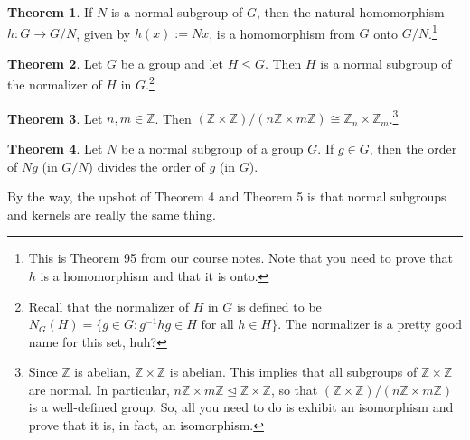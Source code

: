 \documentclass[11pt]{article}
\theoremstyle{definition}
\newtheorem{theorem}{Theorem}
\begin{document}
\begin{theorem}
If $N$ is a normal subgroup of $G$, then the natural homomorphism $h:G \to G/N$, given by $h(x) := Nx$, is a homomorphism from $G$ onto $G/N$.\footnote{This is Theorem 95 from our course notes. Note that you need to prove that $h$ is a homomorphism and that it is onto.}
\end{theorem}

\begin{theorem}
Let $G$ be a group and let $H\leq G$. Then $H$ is a normal subgroup of the normalizer of $H$ in $G$.\footnote{Recall that the normalizer of $H$ in $G$ is defined to be $N_G(H)=\{g\in G: g^{-1}hg\in H\text{ for all } h\in H\}$.  The normalizer is a pretty good name for this set, huh?}
\end{theorem}

\begin{theorem}
Let $n,m \in \mathbb{Z}$.  Then $(\mathbb{Z}\times \mathbb{Z})/(n\mathbb{Z}\times m\mathbb{Z})\cong \mathbb{Z}_n\times \mathbb{Z}_m$.\footnote{Since $\mathbb{Z}$ is abelian, $\mathbb{Z}\times \mathbb{Z}$ is abelian.  This implies that all subgroups of  $\mathbb{Z}\times \mathbb{Z}$ are normal.  In particular, $n\mathbb{Z}\times m\mathbb{Z}\trianglelefteq \mathbb{Z}\times \mathbb{Z}$, so that $(\mathbb{Z}\times \mathbb{Z})/(n\mathbb{Z}\times m\mathbb{Z})$ is a well-defined group.  So, all you need to do is exhibit an isomorphism and prove that it is, in fact, an isomorphism.}
\end{theorem}

\begin{theorem}
Let $N$ be a normal subgroup of a group $G$.  If $g\in G$, then the order of $Ng$ (in $G/N$) divides the order of $g$ (in $G$).
\end{theorem}

By the way, the upshot of Theorem 4 and Theorem 5 is that normal subgroups and kernels are really the same thing.
\end{document}
